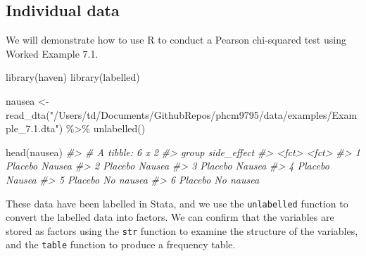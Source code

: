 \documentclass[
]{memoir}
\newenvironment{Shaded}{\begin{snugshade}}{\end{snugshade}}
\newcommand{\CommentTok}[1]{\textcolor[rgb]{0.56,0.35,0.01}{\textit{#1}}}
\newcommand{\FunctionTok}[1]{\textcolor[rgb]{0.00,0.00,0.00}{#1}}
\newcommand{\NormalTok}[1]{#1}
\newcommand{\OtherTok}[1]{\textcolor[rgb]{0.56,0.35,0.01}{#1}}
\newcommand{\SpecialCharTok}[1]{\textcolor[rgb]{0.00,0.00,0.00}{#1}}
\newcommand{\StringTok}[1]{\textcolor[rgb]{0.31,0.60,0.02}{#1}}
\begin{document}
\hypertarget{individual-data-1}{%
\subsection{Individual data}\label{individual-data-1}}

We will demonstrate how to use R to conduct a Pearson chi-squared test using Worked Example 7.1.

\begin{Shaded}
\begin{Highlighting}[]
\FunctionTok{library}\NormalTok{(haven)}
\FunctionTok{library}\NormalTok{(labelled)}

\NormalTok{nausea }\OtherTok{\textless{}{-}} \FunctionTok{read\_dta}\NormalTok{(}\StringTok{"/Users/td/Documents/GithubRepos/phcm9795/data/examples/Example\_7.1.dta"}\NormalTok{) }\SpecialCharTok{\%\textgreater{}\%} 
  \FunctionTok{unlabelled}\NormalTok{()}

\FunctionTok{head}\NormalTok{(nausea)}
\CommentTok{\#\textgreater{} \# A tibble: 6 x 2}
\CommentTok{\#\textgreater{}   group   side\_effect}
\CommentTok{\#\textgreater{}   \textless{}fct\textgreater{}   \textless{}fct\textgreater{}      }
\CommentTok{\#\textgreater{} 1 Placebo Nausea     }
\CommentTok{\#\textgreater{} 2 Placebo Nausea     }
\CommentTok{\#\textgreater{} 3 Placebo Nausea     }
\CommentTok{\#\textgreater{} 4 Placebo Nausea     }
\CommentTok{\#\textgreater{} 5 Placebo No nausea  }
\CommentTok{\#\textgreater{} 6 Placebo No nausea}
\end{Highlighting}
\end{Shaded}

These data have been labelled in Stata, and we use the \texttt{unlabelled} function to convert the labelled data into factors. We can confirm that the variables are stored as factors using the \texttt{str} function to examine the structure of the variables, and the \texttt{table} function to produce a frequency table.

\begin{Shaded}
\end{Shaded}
\end{document}
